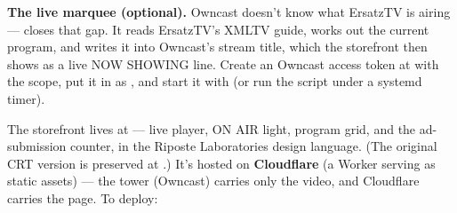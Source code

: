 \documentclass[fontpath=fonts/,logopath=logo/]{riposte-doc}
\begin{document}
\textbf{The live marquee (optional).} Owncast doesn't know what ErsatzTV is airing —  closes that gap. It reads ErsatzTV's XMLTV guide, works out the current program, and writes it into Owncast's stream title, which the storefront then shows as a live NOW SHOWING line. Create an Owncast access token at  with the  scope, put it in  as , and start it with  (or run the script under a systemd timer).



The storefront lives at  — live player, ON AIR light, program grid, and the ad-submission counter, in the Riposte Laboratories design language. (The original CRT version is preserved at .) It's hosted on \textbf{Cloudflare} (a Worker serving  as static assets) — the tower (Owncast) carries only the video, and Cloudflare carries the page. To deploy:
\end{document}
